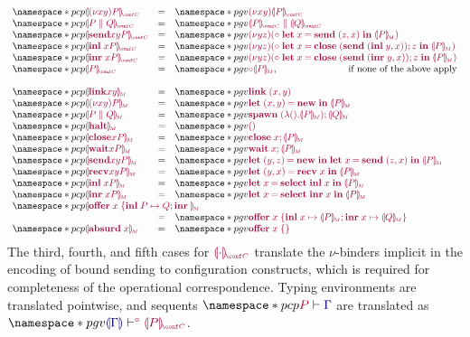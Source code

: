 \documentclass[main.tex]{subfiles}
\begin{document}
\[
  \begin{array}{lcl}
    \pcp{\tm{\cpgvC{\res{x}{y}{P}}}}
    & = & \pgv{\tm{\res{x}{y}{\cpgvC{P}}}} \\
    \pcp{\tm{\cpgvC{\ppar{P}{Q}}}}
    & = & \pgv{\tm{\ppar{\cpgvC{P}}{\cpgvC{Q}}}} \\
    \pcp{\tm{\cpgvC{\send{x}{y}{P}}}}
    & = & \pgv{\tm{\res{y}{z}{(\child\;\letbind{x}{\send\;\pair{z}{x}}{\cpgvM{P}})}}} \\
    \pcp{\tm{\cpgvC{\inl{x}{P}}}}
    & = & \pgv{\tm{\res{y}{z}{(\child\;\letbind{x}{\andthen{\close\;(\send\;\pair{\inl{y}}{x})}{z}}{\cpgvM{P}})}}} \\
    \pcp{\tm{\cpgvC{\inr{x}{P}}}}
    & = & \pgv{\tm{\res{y}{z}{(\child\;\letbind{x}{\andthen{\close\;(\send\;\pair{\inr{y}}{x})}{z}}{\cpgvM{P}})}}} \\
    \pcp{\tm{\cpgvC{P}}}
    & = & \pgv{\tm{\child{\cpgvM{P}}}},\hfill\text{if none of the above apply}\\
    \\
    \pcp{\tm{\cpgvM{\link{x}{y}}}}
    & = & \pgv{\tm{\link\;{\pair{x}{y}}}} \\
    \pcp{\tm{\cpgvM{\res{x}{y}{P}}}}
    & = & \pgv{\tm{\letpair{x}{y}{\new}{\cpgvM{P}}}} \\
    \pcp{\tm{\cpgvM{\ppar{P}{Q}}}}
    & = & \pgv{\tm{\andthen{\spawn\;{(\lambda\unit.\cpgvM{P})}}{\cpgvM{Q}}}} \\
    \pcp{\tm{\cpgvM{\halt}}}
    & = & \pgv{\tm{\unit}} \\
    \pcp{\tm{\cpgvM{\close{x}{P}}}}
    & = & \pgv{\tm{\andthen{\close\;{x}}{\cpgvM{P}}}} \\
    \pcp{\tm{\cpgvM{\wait{x}{P}}}}
    & = & \pgv{\tm{\andthen{\wait\;{x}}{\cpgvM{P}}}} \\
    \pcp{\tm{\cpgvM{\send{x}{y}{P}}}}
    & = & \pgv{\tm{\letpair{y}{z}{\new}{\letbind{x}{\send\;{\pair{z}{x}}}{\cpgvM{P}}}}} \\
    \pcp{\tm{\cpgvM{\recv{x}{y}{P}}}}
    & = & \pgv{\tm{\letpair{y}{x}{\recv\;{x}}{\cpgvM{P}}}} \\
    \pcp{\tm{\cpgvM{\inl{x}{P}}}}
    & = & \pgv{\tm{\letbind{x}{\select{\labinl}\;{x}}{\cpgvM{P}}}} \\
    \pcp{\tm{\cpgvM{\inr{x}{P}}}}
    & = & \pgv{\tm{\letbind{x}{\select{\labinr}\;{x}}{\cpgvM{P}}}} \\
    \multicolumn{3}{l}{\pcp{\tm{\cpgvM{\offer{x}{P}{Q}}}}} \\
    & = & \pgv{\tm{\offer{x}{x}{\cpgvM{P}}{x}{\cpgvM{Q}}}} \\
    \pcp{\tm{\cpgvM{\absurd{x}}}}
    & = & \pgv{\tm{\offeremp{x}}}
  \end{array}
\]
The third, fourth, and fifth cases for $\tm{\cpgvC{\cdot}}$ translate the $\nu$-binders implicit in the encoding of bound sending to configuration constructs, which is required for completeness of the operational correspondence.
Typing environments are translated pointwise, and sequents $\pcp{\seq{P}{\ty{\Gamma}}}$ are translated as $\pgv{\cseq[\child]{\ty{\cpgvT{\ty{\Gamma}}}}{\cpgvC{P}}}$.
\end{document}
